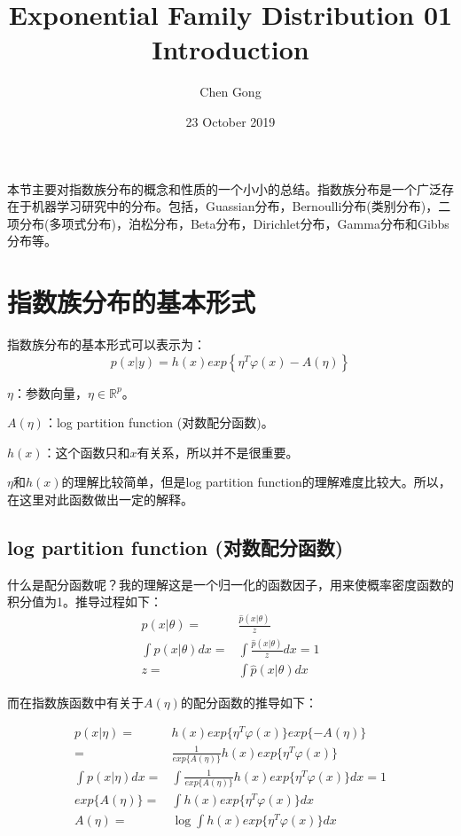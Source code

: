 \documentclass[a4paper]{article}
\title{Exponential Family Distribution 01 Introduction}
\author{Chen Gong}
\date{23 October 2019}
\begin{document}
\maketitle

本节主要对指数族分布的概念和性质的一个小小的总结。指数族分布是一个广泛存在于机器学习研究中的分布。包括，Guassian分布，Bernoulli分布(类别分布)，二项分布(多项式分布)，泊松分布，Beta分布，Dirichlet分布，Gamma分布和Gibbs分布等。

\section{指数族分布的基本形式}
指数族分布的基本形式可以表示为：
\begin{equation}
    p(x|y)=h(x)exp\left\{ \eta^T\varphi(x)-A(\eta) \right\}
\end{equation}

$\eta$：参数向量，$\eta \in \mathbb{R}^p$。

$A(\eta)$：log partition function (对数配分函数)。

$h(x)$：这个函数只和$x$有关系，所以并不是很重要。

$\eta$和$h(x)$的理解比较简单，但是log partition function的理解难度比较大。所以，在这里对此函数做出一定的解释。

\subsection{log partition function (对数配分函数)}
什么是配分函数呢？我的理解这是一个归一化的函数因子，用来使概率密度函数的积分值为1。推导过程如下：
\begin{equation}
    \begin{split}
        p(x|\theta) =  & \frac{\hat{p}(x|\theta)}{z} \\
        \int p(x|\theta) dx = & \int \frac{\hat{p}(x|\theta)}{z}dx = 1 \\
        z = & \int \hat{p}(x|\theta)dx
    \end{split}
\end{equation}

而在指数族函数中有关于$A(\eta)$的配分函数的推导如下：

\begin{equation}
    \begin{split}
        p(x|\eta) = & h(x)exp\{ \eta^T\varphi(x)\}exp\{-A(\eta)\} \\
        = & \frac{1}{exp\{A(\eta)\}} h(x)exp\{ \eta^T\varphi(x)\}\\
        \int p(x|\eta) dx = & \int \frac{1}{exp\{A(\eta)\}} h(x)exp\{ \eta^T\varphi(x)\} dx = 1 \\ 
        exp\{A(\eta)\} = & \int h(x)exp\{ \eta^T\varphi(x)\} dx \\ 
        A(\eta) = & \log \int h(x)exp\{ \eta^T\varphi(x)\} dx
    \end{split}
\end{equation}
\end{document}
